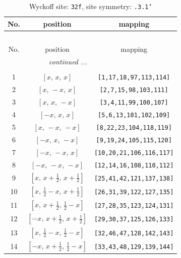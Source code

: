 \documentclass[fleqn,8pt]{jsarticle}
\begin{document}
\begin{longtable}{ccc}
\caption{Wyckoff site: {\tt 32f}, site symmetry: {\tt .3.1'}}
 \\
 \hline \hline
No. & position & mapping \\ \hline \endfirsthead

\multicolumn{2}{l}{\tablename\ \thetable{}} \\
 \hline \hline
No. & position & mapping \\ \hline \endhead

 \hline \hline
\multicolumn{2}{r}{\footnotesize\it continued ...} \\ \endfoot

 \hline \hline
\multicolumn{2}{r}{} \\ \endlastfoot

1 & $\left[ x,\, x,\, x \right]$ & {\tt [1,17,18,97,113,114]} \\ \hline
2 & $\left[ x,\, - x,\, x \right]$ & {\tt [2,7,15,98,103,111]} \\ \hline
3 & $\left[ x,\, x,\, - x \right]$ & {\tt [3,4,11,99,100,107]} \\ \hline
4 & $\left[ - x,\, x,\, x \right]$ & {\tt [5,6,13,101,102,109]} \\ \hline
5 & $\left[ x,\, - x,\, - x \right]$ & {\tt [8,22,23,104,118,119]} \\ \hline
6 & $\left[ - x,\, x,\, - x \right]$ & {\tt [9,19,24,105,115,120]} \\ \hline
7 & $\left[ - x,\, - x,\, x \right]$ & {\tt [10,20,21,106,116,117]} \\ \hline
8 & $\left[ - x,\, - x,\, - x \right]$ & {\tt [12,14,16,108,110,112]} \\ \hline
9 & $\left[ x,\, x + \frac{1}{2},\, x + \frac{1}{2} \right]$ & {\tt [25,41,42,121,137,138]} \\ \hline
10 & $\left[ x,\, \frac{1}{2} - x,\, x + \frac{1}{2} \right]$ & {\tt [26,31,39,122,127,135]} \\ \hline
11 & $\left[ x,\, x + \frac{1}{2},\, \frac{1}{2} - x \right]$ & {\tt [27,28,35,123,124,131]} \\ \hline
12 & $\left[ - x,\, x + \frac{1}{2},\, x + \frac{1}{2} \right]$ & {\tt [29,30,37,125,126,133]} \\ \hline
13 & $\left[ x,\, \frac{1}{2} - x,\, \frac{1}{2} - x \right]$ & {\tt [32,46,47,128,142,143]} \\ \hline
14 & $\left[ - x,\, x + \frac{1}{2},\, \frac{1}{2} - x \right]$ & {\tt [33,43,48,129,139,144]} \\ \hline

\end{longtable}
\end{document}
